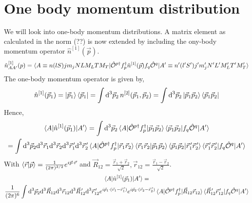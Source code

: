 \documentclass[10pt]{article}
\begin{document}
\section{One body momentum distribution}
We will look into one-body momentum distributions. A matrix element as calculated in the norm (??) is now extended by including the ony-body momentum operator $\hat{n}^{[1]}(\vec{p})$.
\begin{align*}
	\hat{n}_{AA'}^{[1]}(p) = \braket { A \equiv n (l S) j m_j N L M_L T M_T | \hat{\mathcal{O}}^{p\dagger} f_{p}^{\dagger} \hat{n}^{[1]}(\vec{p}) f_{q} \hat{ \mathcal{O}}^{q} | A' \equiv n' (l' S') j' m_j' N' L' M_L' T' M_T' }
\end{align*}
The one-body momentum operator is given by,
\begin{align*}
	\hat{n}^{[1]}(\vec{p}_1) = \ket{\vec{p}_1} \bra{\vec{p}_1} = \int \text{d}^{3} \vec{p}_{2} \, n^{[2]}(\vec{p}_1,\vec{p}_2) = \int \text{d}^{3} \vec{p}_{2} \ket{ \vec{p}_1 \vec{p}_2 } \bra { \vec{p}_1 \vec{p}_2}
\end{align*}
Hence,
\begin{multline*}
	\braket{ A | \hat{n}^{[1]}(\vec{p}_1) | A'} = \int \text{d}^{3} \vec{p}_{2} \braket{ A | \hat{\mathcal{O}}^{p\dagger} f_{p}^{\dagger} | \vec{p}_1 \vec{p}_2 } \braket{ \vec{p}_1 \vec{p}_2 | f_{q} \hat{ \mathcal{O}}^{q} | A'} \\
	=  \int \text{d}^{3} \vec{p}_{2} \text{d}^{3} \vec{r}_{1} \text{d}^{3} \vec{r}_{2} \text{d}^{3} \vec{r}_{1}^{\, \prime} \text{d}^{3} \vec{r}_{2}^{\, \prime} \braket{ A | \hat{\mathcal{O}}^{p\dagger} f_{p}^{\dagger} | \vec{r}_{1} \vec{r}_{2} } \braket{ \vec{r}_1 \vec{r}_2 | \vec{p}_1 \vec{p}_2 } \braket{ \vec{p}_1 \vec{p}_2 | \vec{r}_{1}^{\, \prime} \vec{r}_{2}^{\, \prime} } \braket{ \vec{r}_{1}^{\, \prime} \vec{r}_{2}^{\, \prime} | f_{q} \hat{ \mathcal{O}}^{q} | A'}
\end{multline*}
With $\braket{ \vec{r} | \vec{p} } = \frac{1}{(2 \pi)^{3/2}} e^{i \vec{p} \cdot \vec{r}}$ and $ \vec{R}_{12} = \frac{\vec{r}_{1} + \vec{r}_{2}}{\sqrt{2}}, \vec{r}_{12} = \frac{\vec{r}_{1} - \vec{r}_{2}}{\sqrt{2}}$.
\begin{multline*}
	\braket{ A | \hat{n}^{[1]}(\vec{p}_1) | A'} = \\
  \frac{1}{(2 \pi)^{6}} \int \text{d}^{3} \vec{p}_{2} \text{d}^{3} \vec{R}_{12} \text{d}^{3} \vec{r}_{12} \text{d}^{3} \vec{R}_{12}^{\, \prime} \text{d}^{3} \vec{r}_{12}^{\, \prime}  e^{ i \vec{p}_{1} \cdot ( \vec{r}_{1} - \vec{r}_{1}^{\, \prime}) } e^{ i \vec{p}_{2} \cdot ( \vec{r}_{2} - \vec{r}_{2}^{\, \prime} )} \braket{ A | \hat{\mathcal{O}}^{p\dagger} f_{p}^{\dagger} | \vec{R}_{12} \vec{r}_{12} } \braket{ \vec{R}_{12}^{\, \prime} \vec{r}_{12}^{\, \prime} | f_{q} \hat{ \mathcal{O}}^{q} | A'}
\end{multline*}
\end{document}
